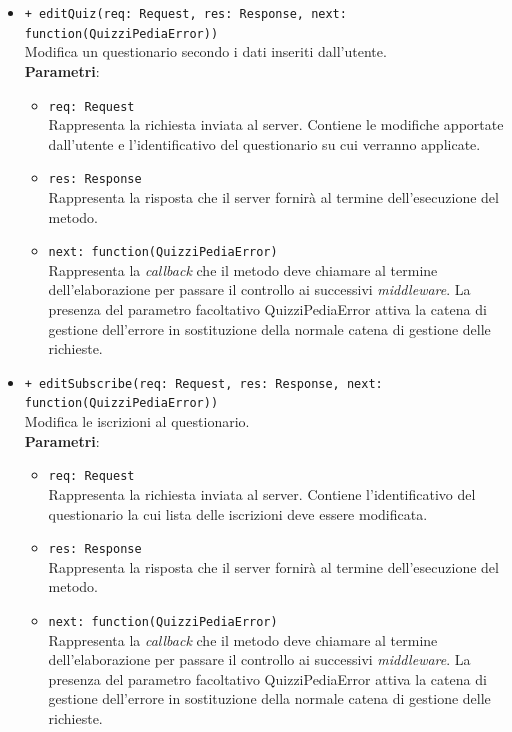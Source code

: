\begin{itemize}
\begin{itemize}
	\item \texttt{+ editQuiz(req: Request, res: Response, next: function(QuizziPediaError))}\\
		Modifica un questionario secondo i dati inseriti dall'utente.\\
		\textbf{Parametri}:
		\begin{itemize}
			\item \texttt{req: Request}\\
			Rappresenta la richiesta inviata al server. Contiene le modifiche apportate dall'utente e l'identificativo del questionario su cui verranno applicate.
			\item \texttt{res: Response}\\
			Rappresenta la risposta che il server fornirà al termine dell'esecuzione del metodo.
			\item \texttt{next: function(QuizziPediaError)}\\
			Rappresenta la \textit{callback} che il metodo deve chiamare al termine dell'elaborazione per passare il controllo ai successivi \textit{middleware}. La presenza del parametro facoltativo QuizziPediaError attiva la catena di gestione dell'errore in sostituzione della normale catena di gestione delle richieste.
		\end{itemize}
		
		\item \texttt{+ editSubscribe(req: Request, res: Response, next: function(QuizziPediaError))}\\
		Modifica le iscrizioni al questionario.\\
		\textbf{Parametri}:
		\begin{itemize}
			\item \texttt{req: Request}\\
			Rappresenta la richiesta inviata al server. Contiene l'identificativo del questionario la cui lista delle iscrizioni deve essere modificata.
			\item \texttt{res: Response}\\
			Rappresenta la risposta che il server fornirà al termine dell'esecuzione del metodo.
			\item \texttt{next: function(QuizziPediaError)}\\
			Rappresenta la \textit{callback} che il metodo deve chiamare al termine dell'elaborazione per passare il controllo ai successivi \textit{middleware}. La presenza del parametro facoltativo QuizziPediaError attiva la catena di gestione dell'errore in sostituzione della normale catena di gestione delle richieste.
		\end{itemize}
		

\end{itemize}
\end{itemize}
